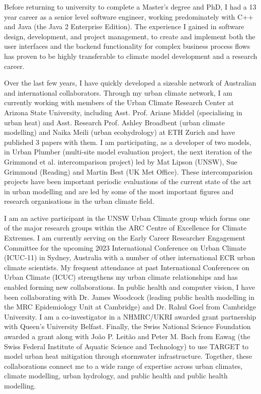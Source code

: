 Before returning to university to complete a Master's degree and PhD, I had a 13 year career as a senior level software engineer, working predominately with C++ and Java (the Java 2 Enterprise Edition). The experience I gained in software design, development, and project management, to create and implement both the user interfaces and the backend functionality for complex business process flows has proven to be highly transferable to climate model development and a research career. 

Over the last few years, I have quickly developed a sizeable network of Australian and international collaborators. Through my urban climate network, I am currently working with members of the Urban Climate Research Center at Arizona State University, including Asst. Prof. Ariane Middel (specialising in urban heat) and Asst. Research Prof. Ashley Broadbent (urban climate modelling) and Naika Meili (urban ecohydrology) at ETH Zurich and have published 3 papers with them. I am participating, as a developer of two models, in Urban Plumber (multi-site model evaluation project, the next iteration of the Grimmond et al.\cite{Grimmond2011} intercomparison project) led by Mat Lipson (UNSW), Sue Grimmond (Reading) and Martin Best (UK Met Office). These intercomparision projects have been important periodic evaluations of the current state of the art in urban modelling and are led by some of the most important figures and research organisations in the urban climate field. 

I am an active participant in the UNSW Urban Climate group which forms one of the major research groups within the ARC Centre of Excellence for Climate Extremes. I am currently serving on the Early Career Researcher Engagement Committee for the upcoming 2023 International Conference on Urban Climate (ICUC-11) in Sydney, Australia with a number of other international ECR urban climate scientists. My frequent attendance at past International Conferences on Urban Climate (ICUC) strengthens my urban climate relationships and has enabled forming new collaborations. In public health and computer vision, I have been collaborating with Dr. James Woodcock (leading public health modelling in the MRC Epidemiology Unit at Cambridge) and Dr. Rahul Goel from Cambridge University. I am a co-investigator in a NHMRC/UKRI awarded grant partnership with Queen's University Belfast. Finally, the Swiss National Science Foundation awarded a grant along with Jo\~{a}o P. Leit\~{a}o and Peter M. Bach from Eawag (the Swiss Federal Institute of Aquatic Science and Technology) to use TARGET to model urban heat mitigation through stormwater infrastructure. Together, these collaborations connect me to a wide range of expertise across urban climates, climate modelling, urban hydrology, and public health and public health modelling.

